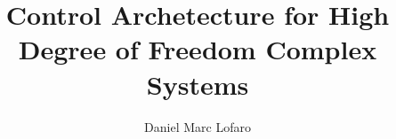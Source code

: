 \documentclass[12pt, letterpaper]{drexelthesis}
\author{Daniel Marc Lofaro}
\title{Control Archetecture for High Degree of Freedom Complex Systems}
\begin{document}
 

	\doublespacing
	\maketitle 
\begin{preliminary}
	\sloppy
	\copyrightpage
	
	
	
	
	
	\mytableofcontents
	\mylistoftables
	\mylistoffigures
\end{preliminary}

\begin{thesis}
	\fussy
	
%	
	
	

	\singlespacing
%	
	
	
%	

	\appendix
\end{thesis}
\end{document}
